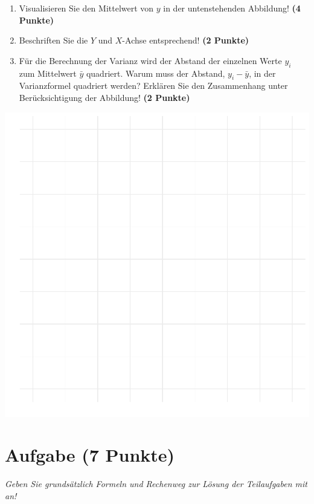 \documentclass[a4paper, 10pt]{scrartcl}\usepackage[]{graphicx}\usepackage[]{xcolor}
\makeatletter
\def\maxwidth{ %
  \ifdim\Gin@nat@width>\linewidth
    \linewidth
  \else
    \Gin@nat@width
  \fi
}
\makeatother
\begin{document}
\begin{enumerate}
\item Visualisieren Sie den Mittelwert von $y$ in der untenstehenden
  Abbildung! \textbf{(4 Punkte)}
\item Beschriften Sie die $Y$ und $X$-Achse entsprechend! \textbf{(2 Punkte)}
\item F{\"u}r die Berechnung der Varianz wird der Abstand der einzelnen Werte $y_i$
  zum Mittelwert $\bar{y}$ quadriert. Warum muss der Abstand, $y_i -
  \bar{y}$, in der Varianzformel quadriert werden?
  Erkl{\"a}ren Sie den Zusammenhang unter Ber{\"u}cksichtigung der Abbildung!
  \textbf{(2 Punkte)}  
\end{enumerate}



{\centering \includegraphics[width=\maxwidth]{img/desc-01-1} 

}


 
\clearpage

\section{Aufgabe \hfill (7 Punkte)}

\textit{Geben Sie grunds{\"a}tzlich Formeln und Rechenweg zur L{\"o}sung der
  Teilaufgaben mit an!} \\[1Ex]
\end{document}
